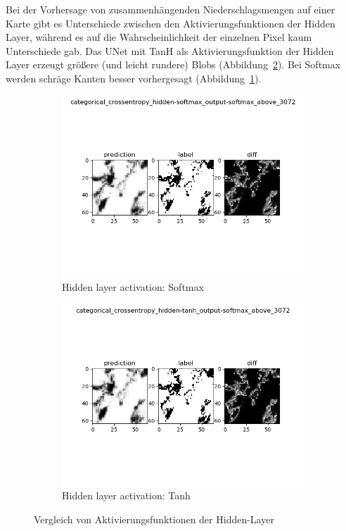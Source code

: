 Bei der Vorhersage von zusammenhängenden Niederschlagsmengen auf einer Karte gibt es Unterschiede zwischen den Aktivierungsfunktionen der Hidden Layer, während es auf die Wahrscheinlichkeit der einzelnen Pixel kaum Unterschiede gab.
Das UNet mit TanH als Aktivierungsfunktion der Hidden Layer erzeugt größere (und leicht rundere) Blobs (Abbildung~\ref{fig:hiddenActivationTanh}). Bei Softmax werden schräge Kanten besser vorhergesagt (Abbildung~\ref{fig:hiddenActivationSoftmax}).
\begin{figure}[ht]
\centering
\begin{subfigure}{0.5\textwidth}
\centering
\includegraphics[width=\linewidth]{pics/categorical_crossentropy_hidden-softmax_output-softmax_above_3072}
\caption{Hidden layer activation: Softmax}
\label{fig:hiddenActivationSoftmax}
\end{subfigure}%
\begin{subfigure}{0.5\textwidth}
\centering
\includegraphics[width=\linewidth]{pics/categorical_crossentropy_hidden-tanh_output-softmax_above_3072}
\caption{Hidden layer activation: Tanh}
\label{fig:hiddenActivationTanh}
\end{subfigure}%
\caption{Vergleich von Aktivierungsfunktionen der Hidden-Layer}
\label{fig:activatinHidden}
\end{figure}


